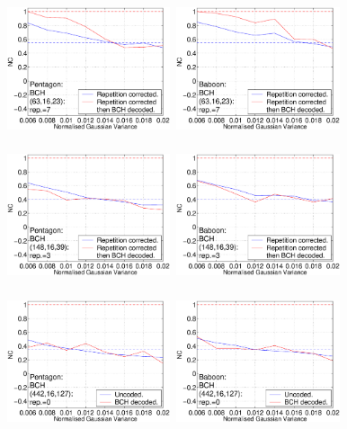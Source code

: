 \documentclass[12pt]{report}
\begin{document}
\begin{figure}[p]
\centerline{ \hbox{
\includegraphics[height=3.81cm,width=4.8cm]{EPS_BK_formattedBetter/SGpent63.eps}
\includegraphics[height=3.81cm,width=4.8cm]{EPS_BK_formattedBetter/SGbab63.eps} \\
}}
 
\centerline{ \hbox{
\includegraphics[height=3.81cm,width=4.8cm]{EPS_BK_formattedBetter/SGpent148.eps}
\includegraphics[height=3.81cm,width=4.8cm]{EPS_BK_formattedBetter/SGbab148.eps} \\
}}
 
\centerline{ \hbox{
\includegraphics[height=3.81cm,width=4.8cm]{EPS_BK_formattedBetter/SGpent442.eps}
\includegraphics[height=3.81cm,width=4.8cm]{EPS_BK_formattedBetter/SGbab442.eps}
}}
 

\end{figure}
\end{document}
